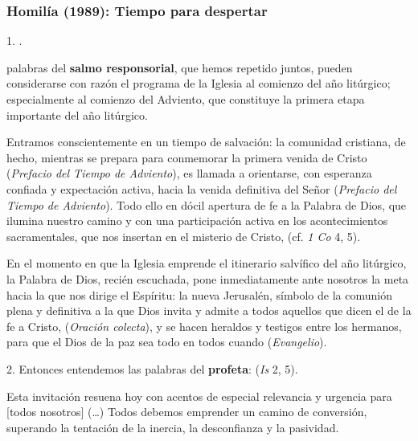 \newpage
\subsubsection{Homilía (1989): Tiempo para despertar}


\begin{body}
	1. . 
	
	 palabras del \textbf{salmo responsorial}, que hemos repetido juntos, pueden considerarse con razón el programa de la Iglesia al comienzo del año litúrgico; especialmente al comienzo del Adviento, que constituye la primera etapa importante del año litúrgico. 
	
	Entramos conscientemente en un tiempo  de salvación: la comunidad cristiana, de hecho, mientras se prepara para conmemorar la primera venida de Cristo  (\emph{Prefacio del Tiempo de Adviento}), es llamada a orientarse, con esperanza confiada y expectación activa, hacia la venida definitiva del Señor  (\emph{Prefacio del Tiempo de Adviento}). Todo ello en dócil apertura de fe a la Palabra de Dios, que ilumina nuestro camino y con una participación activa en los acontecimientos sacramentales, que nos insertan en el misterio de Cristo,  (cf. \emph{1 Co} 4, 5). 
	
	En el momento en que la Iglesia emprende el itinerario salvífico del año litúrgico, la Palabra de Dios, recién escuchada, pone inmediatamente ante nosotros la meta hacia la que nos dirige el Espíritu: la nueva Jerusalén, símbolo de la comunión plena y definitiva a la que Dios invita y admite a todos aquellos que dicen el  de la fe a Cristo,  (\emph{Oración colecta}), y se hacen heraldos y testigos entre los hermanos, para que el Dios de la paz sea todo en todos cuando  (\emph{Evangelio}). 
	
	2. Entonces entendemos las palabras del \textbf{profeta}:  (\emph{Is} 2, 5). 
	
	Esta invitación resuena hoy con acentos de especial relevancia y urgencia para {[}todos nosotros{]} (\ldots{}) Todos debemos emprender un camino de conversión, superando la tentación de la inercia, la desconfianza y la pasividad. 
	

\end{body}
